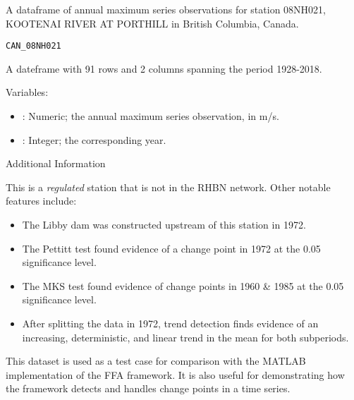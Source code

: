 \documentclass[a4paper]{book}
\begin{document}
%
\begin{Description}
A dataframe of annual maximum series observations for
station 08NH021, KOOTENAI RIVER AT PORTHILL in British Columbia, Canada.
\end{Description}
%
\begin{Usage}
\begin{verbatim}
CAN_08NH021
\end{verbatim}
\end{Usage}
%
\begin{Format}
A dateframe with 91 rows and 2 columns spanning the period 1928-2018.
\end{Format}
%
\begin{Details}
Variables:
\begin{itemize}

\item{} : Numeric; the annual maximum series observation, in m/s.
\item{} : Integer; the corresponding year.

\end{itemize}

\end{Details}
%
\begin{Section}{Additional Information}

This is a \emph{regulated} station that is not in the RHBN network. Other notable features include:
\begin{itemize}

\item{} The Libby dam was constructed upstream of this station in 1972.
\item{} The Pettitt test found evidence of a change point in 1972 at the 0.05 significance level.
\item{} The MKS test found evidence of change points in 1960 \& 1985 at the 0.05 significance level.
\item{} After splitting the data in 1972, trend detection finds evidence of an increasing,
deterministic, and linear trend in the mean for both subperiods.

\end{itemize}


This dataset is used as a test case for comparison with the MATLAB implementation of the
FFA framework. It is also useful for demonstrating how the framework detects and handles
change points in a time series.
\end{Section}
\end{document}
